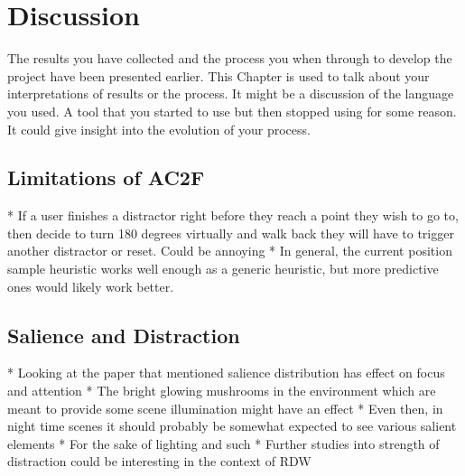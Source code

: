 \chapter{Discussion}
\label{chap:discussion}

The results you have collected and the process you when through to develop the project have been presented earlier.  This Chapter is used to talk about your interpretations of results or the process. It might be a discussion of the language you used.  A tool that you started to use but then stopped using for some reason.  It could give insight into the evolution of your process.


\section{Limitations of AC2F}
* If a user finishes a distractor right before they reach a point they wish to go to, then decide to turn 180 degrees virtually and walk back they will have to trigger another distractor or reset. Could be annoying
   * In general, the current position sample heuristic works well enough as a generic heuristic, but more predictive ones would likely work better. 
   
\section{Salience and Distraction}
* Looking at the paper that mentioned salience distribution has effect on focus and attention
   * The bright glowing mushrooms in the environment which are meant to provide some scene illumination might have an effect 
   * Even then, in night time scenes it should probably be somewhat expected to see various salient elements
      * For the sake of lighting and such
   * Further studies into strength of distraction could be interesting in the context of RDW